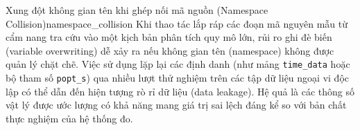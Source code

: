 \begin{pitfall}{Xung đột không gian tên khi ghép nối mã nguồn (Namespace Collision)}{namespace_collision}
Khi thao tác lắp ráp các đoạn mã nguyên mẫu từ cẩm nang tra cứu vào một kịch bản phân tích quy mô lớn, rủi ro ghi đè biến (variable overwriting) dễ xảy ra nếu không gian tên (namespace) không được quản lý chặt chẽ. Việc sử dụng lặp lại các định danh (như mảng \texttt{time\_data} hoặc bộ tham số \texttt{popt\_s}) qua nhiều lượt thử nghiệm trên các tập dữ liệu ngoại vi độc lập có thể dẫn đến hiện tượng rò rỉ dữ liệu (data leakage). Hệ quả là các thông số vật lý được ước lượng có khả năng mang giá trị sai lệch đáng kể so với bản chất thực nghiệm của hệ thống đo.
\end{pitfall}